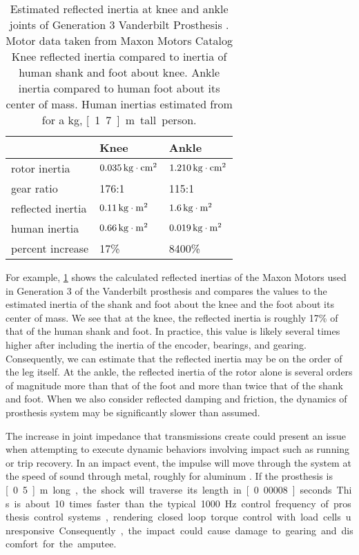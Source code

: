 \begin{table}
  \centering
  \begin{tabular}{lll}
    \toprule
    & Knee & Ankle \\
    \midrule
    rotor inertia & $\unit[0.035]{kg \cdot cm^2}$ 
        & $\unit[1.210]{kg \cdot cm^2}$\\
    gear ratio & 176:1 & 115:1 \\
    reflected inertia & $\unit[0.11]{kg \cdot m^2}$ & 
        $\unit[1.6]{kg \cdot m^2}$\\
    human inertia & $\unit[0.66]{kg \cdot m^2}$  & $\unit[0.019]{kg \cdot m^2}$\\
    percent increase & 17\% & 8400\% \\
    \bottomrule
  \end{tabular}
  \caption{Estimated reflected inertia at knee and ankle joints of Generation 3
  Vanderbilt Prosthesis \citep{lawson2014robotic}. Motor data taken from Maxon
  Motors Catalog\citep{maxon_flat_motor,
  maxon_ec4pole} Knee reflected inertia compared to inertia of human shank and
  foot about knee. Ankle inertia compared to human foot about its center of
  mass. Human inertias estimated from \citet{winter2009biomechanics} for a
  \unit[85]{kg}, \unit[1.7]{m} tall person.}
  \label{tab:vanderbilt_reflec_interita}
\end{table}

For example, \cref{tab:vanderbilt_reflec_interita} shows the calculated
reflected inertias of the Maxon Motors used in Generation 3 of the Vanderbilt
prosthesis and compares the values to the estimated inertia of the shank and
foot about the knee and the foot about its center of mass. We see that at the
knee, the reflected inertia is roughly 17\% of that of the human shank and foot.
In practice, this value is likely several times higher after including the
inertia of the encoder, bearings, and gearing. Consequently, we can estimate
that the reflected inertia may be on the order of the leg itself. At the ankle,
the reflected inertia of the rotor alone is several orders of magnitude more
than that of the foot and more than twice that of the shank and foot. When we
also consider reflected damping and friction, the dynamics of prosthesis system
may be significantly slower than assumed.

The increase in joint impedance that transmissions create could present an issue
when attempting to execute dynamic behaviors involving impact such as running or
trip recovery. In an impact event, the impulse will move through the system at
the speed of sound through metal, roughly  for aluminum
\citep{lide2004crc}. If the prosthesis is \unit[0.5]{m} long, the shock will
traverse its length in \unit[0.00008]{seconds}. This is about 10 times faster
than the typical 1000 Hz control frequency of prosthesis control systems,
rendering closed loop torque control with load cells unresponsive. Consequently,
the impact could cause damage to gearing and discomfort for the amputee.

